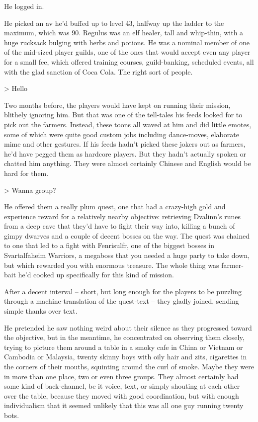 He logged in.

He picked an av he'd buffed up to level 43, halfway up the ladder
to the maximum, which was 90. Regulus was an elf healer, tall and
whip-thin, with a huge rucksack bulging with herbs and potions. He
was a nominal member of one of the mid-sized player guilds, one of
the ones that would accept even any player for a small fee, which
offered training courses, guild-banking, scheduled events, all with
the glad sanction of Coca Cola. The right sort of people.

\textgreater{} Hello

Two months before, the players would have kept on running their
mission, blithely ignoring him. But that was one of the tell-tales
his feeds looked for to pick out the farmers. Instead, these toons
all waved at him and did little emotes, some of which were quite
good custom jobs including dance-moves, elaborate mime and other
gestures. If his feeds hadn't picked these jokers out as farmers,
he'd have pegged them as hardcore players. But they hadn't actually
spoken or chatted him anything. They were almost certainly Chinese
and English would be hard for them.

\textgreater{} Wanna group?

He offered them a really plum quest, one that had a crazy-high gold
and experience reward for a relatively nearby objective: retrieving
Dvalinn's runes from a deep cave that they'd have to fight their
way into, killing a bunch of gimpy dwarves and a couple of decent
bosses on the way. The quest was chained to one that led to a fight
with Fenrisulfr, one of the biggest bosses in Svartalfaheim
Warriors, a megaboss that you needed a huge party to take down, but
which rewarded you with enormous treasure. The whole thing was
farmer-bait he'd cooked up specifically for this kind of mission.

After a decent interval -- short, but long enough for the players
to be puzzling through a machine-translation of the quest-text --
they gladly joined, sending simple thanks over text.

He pretended he saw nothing weird about their silence as they
progressed toward the objective, but in the meantime, he
concentrated on observing them closely, trying to picture them
around a table in a smoky cafe in China or Vietnam or Cambodia or
Malaysia, twenty skinny boys with oily hair and zits, cigarettes in
the corners of their mouths, squinting around the curl of smoke.
Maybe they were in more than one place, two or even three groups.
They almost certainly had some kind of back-channel, be it voice,
text, or simply shouting at each other over the table, because they
moved with good coordination, but with enough individualism that it
seemed unlikely that this was all one guy running twenty bots.

